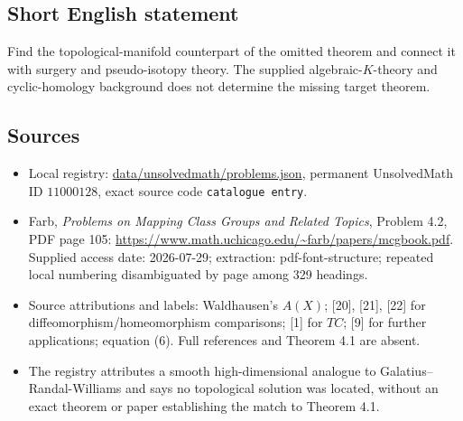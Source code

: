 \documentclass[11pt]{article}
\begin{document}
\subsection{Short English statement}
Find the topological-manifold counterpart of the omitted theorem and connect it with surgery and pseudo-isotopy theory. The supplied algebraic-$K$-theory and cyclic-homology background does not determine the missing target theorem.
\subsection{Sources}
\begin{itemize}
\item Local registry: \url{data/unsolvedmath/problems.json}, permanent UnsolvedMath ID $11000128$, exact source code \texttt{catalogue entry}.
\item Farb, \emph{Problems on Mapping Class Groups and Related Topics}, Problem 4.2, PDF page 105: \url{https://www.math.uchicago.edu/~farb/papers/mcgbook.pdf}. Supplied access date: 2026-07-29; extraction: pdf-font-structure; repeated local numbering disambiguated by page among 329 headings.
\item Source attributions and labels: Waldhausen's $A(X)$; [20], [21], [22] for diffeomorphism/homeomorphism comparisons; [1] for $TC$; [9] for further applications; equation (6). Full references and Theorem 4.1 are absent.
\item The registry attributes a smooth high-dimensional analogue to Galatius--Randal-Williams and says no topological solution was located, without an exact theorem or paper establishing the match to Theorem 4.1.
\end{itemize}
\end{document}
